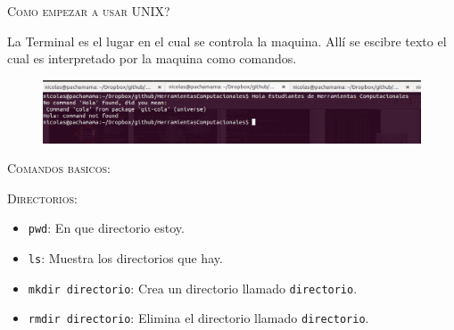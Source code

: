\documentclass{beamer}
\begin{document}
\begin{frame}{\textsc{Como empezar a usar UNIX?}}

\begin{Large}
\textrm{La Terminal es el lugar en el cual se controla la maquina.
All\'i se escibre texto el cual es interpretado por la maquina como comandos.}
\end{Large}

\begin{figure}
\includegraphics[scale=0.3]{fig3.png}
\end{figure}

\end{frame}



\begin{frame}{\textsc{Comandos basicos:}}

\begin{center}
{\large \textsc{Directorios:}}
\end{center}
\begin{itemize}
\item \texttt{pwd}: \textrm{En que directorio estoy.}\\
\item \texttt{ls}: \textrm{Muestra los directorios que hay.}\\
\item \texttt{mkdir directorio}: \textrm{Crea un directorio llamado \texttt{directorio}}. 
\item \texttt{rmdir directorio}: \textrm{Elimina el directorio llamado \texttt{directorio}}.
\end{itemize}

\end{frame}


\end{document}
